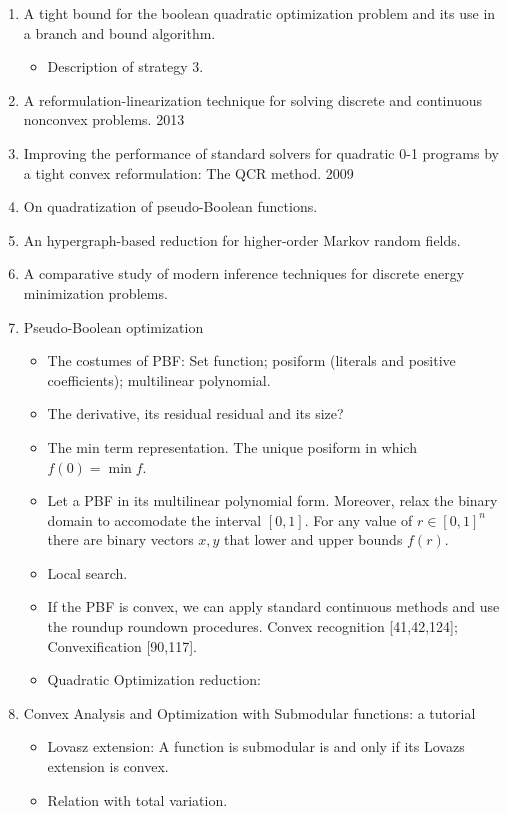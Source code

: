 \begin{enumerate}
\begin{itemize}
	\end{itemize}
	\item{ A tight bound for the boolean quadratic optimization
problem and its use in a branch and bound algorithm.}
	\begin{itemize}
		\item{Description of strategy 3.}
	\end{itemize}
	\item{A reformulation-linearization technique for solving discrete and continuous nonconvex problems. 2013}
	\item{Improving the performance of standard solvers for quadratic 0-1 programs by a tight convex reformulation: The QCR method. 2009}
	\item{On quadratization of pseudo-Boolean functions.}
	\item{An hypergraph-based reduction for higher-order Markov
random fields.}
	\item{A comparative study of modern inference techniques for discrete energy minimization problems.}
	\item{Pseudo-Boolean optimization}
	\begin{itemize}
		\item{The costumes of PBF: Set function; posiform (literals and positive coefficients); multilinear polynomial.}
		\item{The derivative, its residual residual and its size?}
		\item{The min term representation. The unique posiform in which $f(0) = \min f$.}
		\item{Let a PBF in its multilinear polynomial form. Moreover, relax the binary domain to accomodate the interval $[0,1]$. For any value of $r \in [0,1]^n$ there are binary vectors $x,y$ that lower and upper bounds $f(r)$. }
		\item{Local search.}
		\item{If the PBF is convex, we can apply standard continuous methods and use the roundup roundown procedures. Convex recognition [41,42,124]; Convexification [90,117].}
		\item{Quadratic Optimization reduction: }
	\end{itemize}
	\item{Convex Analysis and Optimization with Submodular functions: a tutorial}
	\begin{itemize}
	\item{Lovasz extension: A function is submodular is and only if its Lovazs extension is convex.}
	\item{Relation with total variation.}
	\end{itemize}
\end{enumerate}